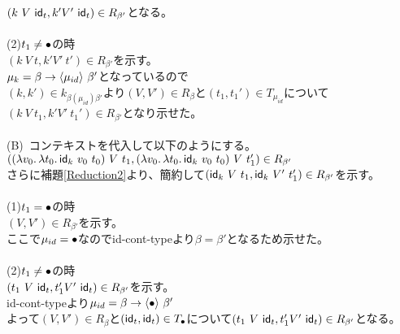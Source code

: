$(k\ V\ \Idt,k' V'\ \Idt)\in R_{\beta'}$となる。\\
\\
(2)$t_1 \neq \Bullet$の時\\
$(k\ V\ t,k' V'\ t')\in R_{\beta'}$を示す。\\
$\mu_k = \Trail{\beta}{\beta'}{\mu_{id}}$となっているので\\
$(k,k')\in k_{\beta(\mu_{id})\beta'}$より$(V,V')\in R_{\beta}$と$(t_1,t_1')\in T_{\mu_{id}}$について\\
$(k\ V\ t_1,k' V'\ t_1')\in R_{\beta'}$となり示せた。\\
\\
(B)\ コンテキストを代入して以下のようにする。\\
$(\LamP{v_0}{\Lam{t_0}{\Idk\ v_0\ t_0}}\ V\ t_1,
\LamP{v_0}{\Lam{t_0}{\Idk\ v_0\ t_0}}\ V\ t_1')\in R_{\beta'}$\\
さらに補題\ref{Reduction2}より、簡約して$(\Idk\ V\ t_1,\Idk\ V'\ t_1')\in R_{\beta'}$を示す。\\
\\
(1)$t_1=\Bullet$の時\\
$(V,V')\in R_{\beta'}$を示す。\\
ここで$\mu_{id}=\Bullet$なので\textsf{id-cont-type}より$\beta=\beta'$となるため示せた。\\
\\
(2)$t_1 \neq \Bullet$の時\\
$(t_1\ V\ \Idt,t_1' V'\ \Idt)\in R_{\beta'}$を示す。\\
\textsf{id-cont-type}より$\mu_{id}=\Trail{\beta}{\beta'}{\Bullet}$\\
よって$(V,V')\in R_{\beta}$と$(\Idt,\Idt)\in T_{\Bullet}$について$(t_1\ V\ \Idt,t_1' V'\ \Idt)\in R_{\beta'}$となる。

